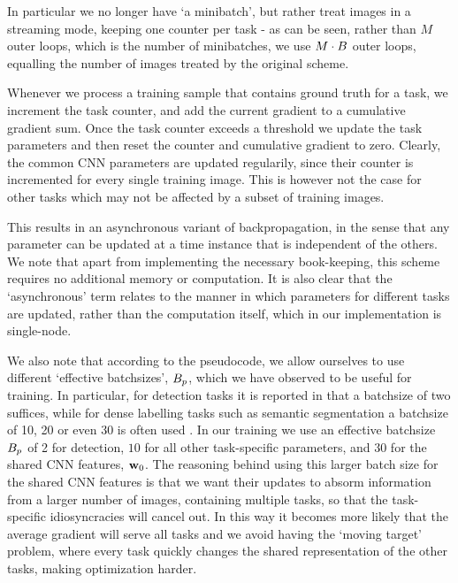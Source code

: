 \documentclass[10pt,twocolumn,letterpaper]{article}
\begin{document}
In particular we no longer have `a minibatch', but rather treat images in a streaming mode, keeping one counter per task - as can be seen, rather than $M$ outer loops, which is the number of minibatches, we use $M\cdot B$ outer loops, equalling the number of images treated by the original scheme. 

 Whenever we process a training sample that contains ground truth for a task, we increment the task counter, and add the current gradient to a cumulative gradient sum. Once the task counter exceeds a threshold we update the task parameters and then reset the  counter and cumulative gradient to zero. 
 Clearly, the common CNN parameters are updated regularily, since their counter is  incremented for every single training image. This is however not the case for other tasks which may not be affected by a subset of training images. 
 
 This results in an asynchronous variant of backpropagation, in the sense that any parameter can be updated at a time instance that is independent of the others. We note that apart from implementing the necessary book-keeping, this scheme requires no additional memory or computation. It is also clear that the `asynchronous' term relates to the manner in which parameters for different tasks are updated, rather than the computation itself, which in our implementation is single-node. 



We also note that according to the pseudocode, we allow ourselves to use different `effective batchsizes', $B_{p}$, which we have observed to be useful for training. In particular, for detection tasks it is reported in \cite{Girshick15} that a batchsize of two suffices, while for dense labelling tasks such as  semantic segmentation a batchsize of 10, 20 or even 30 is often used  \cite{hed,ChenPK0Y16}.
In our training we use an effective batchsize  $B_{p}$ of 2 for detection, $10$ for all other task-specific parameters, and $30$ for the shared CNN features, $\mathbf{w}_{0}$. The reasoning behind  using this larger batch size for the shared CNN features is that we want their updates to absorm information from a larger number of images, containing multiple tasks, so that the task-specific idiosyncracies will cancel out. In this way it becomes more likely that 
the average gradient will serve all tasks and  we avoid having the `moving target' problem, where every task quickly changes the shared representation of the other tasks,  making optimization harder. 
\end{document}
